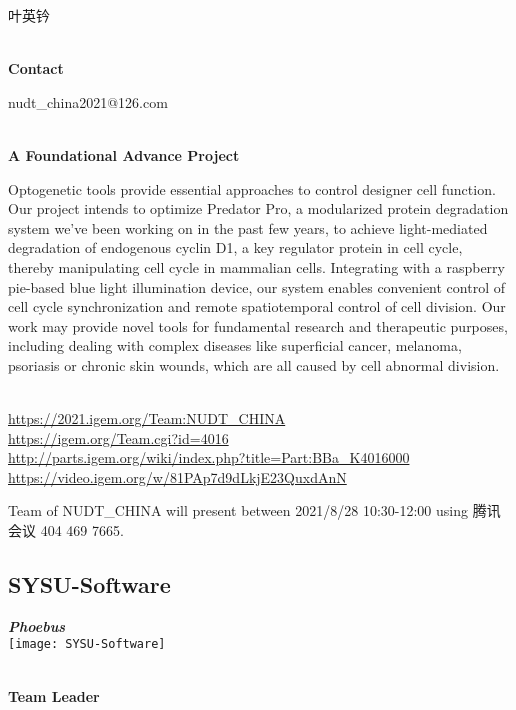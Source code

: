   叶英钤


\textbf{\\Contact}

  nudt\_china2021@126.com


\textbf{\\A Foundational Advance Project\\}\begin{spacing}{1.5}

Optogenetic tools provide essential approaches to control designer cell function. Our project intends to optimize Predator Pro, a modularized protein degradation system we've been working on in the past few years, to achieve light-mediated degradation of endogenous cyclin D1, a key regulator protein in cell cycle, thereby manipulating cell cycle in mammalian cells. Integrating with a raspberry pie-based blue light illumination device, our system enables convenient control of cell cycle synchronization and remote spatiotemporal control of cell division. Our work may provide novel tools for fundamental research and therapeutic purposes, including dealing with complex diseases like superficial cancer, melanoma, psoriasis or chronic skin wounds, which are all caused by cell abnormal division.\end{spacing}
\\

\url{https://2021.igem.org/Team:NUDT\_CHINA }\\
\url{https://igem.org/Team.cgi?id=4016 }\\
\url{http://parts.igem.org/wiki/index.php?title=Part:BBa_K4016000 }\\
\url{https://video.igem.org/w/81PAp7d9dLkjE23QuxdAnN }\\

\vfill{}









Team of NUDT\_CHINA will present between     2021/8/28 10:30-12:00    using 腾讯会议 404 469 7665.
\newpage


\subsection{\textcolor{Blu}{ SYSU-Software } }
\vspace{5mm}
\begin{center}
\large{
  \textbf{ \textit{Phoebus} }\\

  \texttt{[image: SYSU-Software]}
}
\end{center}
\textbf{\\Team Leader}

